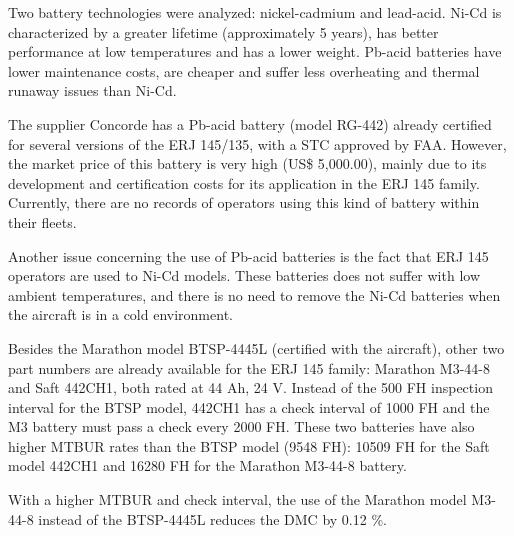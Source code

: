 ﻿%
Two battery technologies were analyzed: nickel-cadmium and lead-acid. Ni-Cd is characterized by a greater lifetime (approximately 5 years), has better performance at low temperatures and has a lower weight. Pb-acid batteries have lower maintenance costs, are cheaper and suffer less overheating and thermal runaway issues than Ni-Cd.

The supplier Concorde has a Pb-acid battery (model RG-442) already certified for several versions of the ERJ 145/135, with a STC approved by FAA. However, the market price of this battery is very high (US\$ 5,000.00), mainly due to its development and certification costs for its application in the ERJ 145 family. Currently, there are no records of operators using this kind of battery within their fleets.

Another issue concerning the use of Pb-acid batteries is the fact that ERJ 145 operators are used to Ni-Cd models. These batteries does not suffer with low ambient temperatures, and there is no need to remove the Ni-Cd batteries when the aircraft is in a cold environment.

Besides the Marathon model BTSP-4445L (certified with the aircraft), other two part numbers are already available for the ERJ 145 family: Marathon M3-44-8 and Saft 442CH1, both rated at 44 Ah, 24 V. Instead of the 500 FH inspection interval for the BTSP model, 442CH1 has a check interval of 1000 FH and the M3 battery must pass a check every 2000 FH. These two batteries have also higher MTBUR rates than the BTSP model (9548 FH): 10509 FH for the Saft model 442CH1 and 16280 FH for the Marathon M3-44-8 battery.

With a higher MTBUR and check interval, the use of the Marathon model M3-44-8 instead of the BTSP-4445L reduces the DMC by 0.12 \%.
